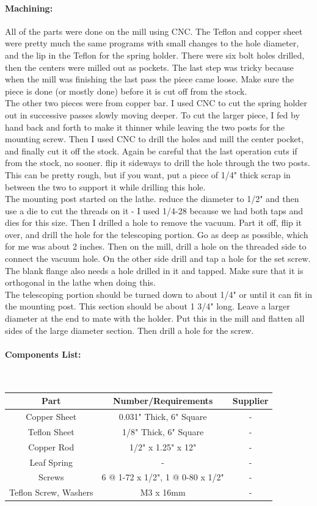 \documentclass[12pt]{report}
\begin{document}
\paragraph{Machining:} All of the parts were done on the mill using CNC. The Teflon and copper sheet were pretty much the same programs with small changes to the hole diameter, and the lip in the Teflon for the spring holder. There were six bolt holes drilled, then the centers were milled out as pockets. The last step was tricky because when the mill was finishing the last pass the piece came loose. Make sure the piece is done (or mostly done) before it is cut off from the stock.\\
The other two pieces were from copper bar. I used CNC to cut the spring holder out in successive passes slowly moving deeper. To cut the larger piece, I fed by hand back and forth to make it thinner while leaving the two posts for the mounting screw. Then I used CNC to drill the holes and mill the center pocket, and finally cut it off the stock. Again be careful that the last operation cuts if from the stock, no sooner. flip it sideways to drill the hole through the two posts. This can be pretty rough, but if you want, put a piece of 1/4" thick scrap in between the two to support it while drilling this hole.\\
The mounting post started on the lathe. reduce the diameter to 1/2" and then use a die to cut the threads on it - I used 1/4-28 because we had both taps and dies for this size. Then I drilled a hole to remove the vacuum. Part it off, flip it over, and drill the hole for the telescoping portion. Go as deep as possible, which for me was about 2 inches. Then on the mill, drill a hole on the threaded side to connect the vacuum hole. On the other side drill and tap a hole for the set screw. The blank flange also needs a hole drilled in it and tapped. Make sure that it is orthogonal in the lathe when doing this. \\
The telescoping portion should be turned down to about 1/4" or until it can fit in the mounting post. This section should be about 1 3/4" long. Leave a larger diameter at the end to mate with the holder. Put this in the mill and flatten all sides of the large diameter section. Then drill a hole for the screw.

\paragraph{Components List:} \hspace{1cm} \\
\begin{tabular}{c|c|c}
Part & Number/Requirements & Supplier\\
\hline
Copper Sheet & 0.031" Thick, 6" Square & -\\
Teflon Sheet & 1/8" Thick, 6" Square & -\\
Copper Rod & 1/2" x 1.25" x 12" & -\\
Leaf Spring & - & -\\
Screws & 6 @ 1-72 x 1/2", 1 @ 0-80 x 1/2" & -\\
Teflon Screw, Washers & M3 x 16mm & -\\

\end{tabular}
\end{document}
